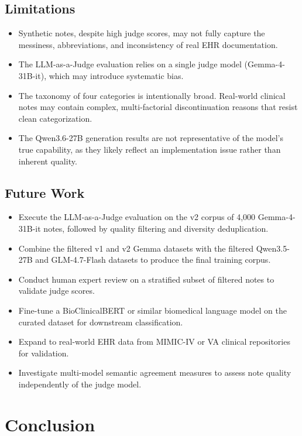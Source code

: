 \documentclass[11pt, a4paper]{article}
\begin{document}
\subsection{Limitations}

\begin{itemize}
    \item Synthetic notes, despite high judge scores, may not fully capture the messiness, abbreviations, and inconsistency of real EHR documentation.
    \item The LLM-as-a-Judge evaluation relies on a single judge model (Gemma-4-31B-it), which may introduce systematic bias.
    \item The taxonomy of four categories is intentionally broad. Real-world clinical notes may contain complex, multi-factorial discontinuation reasons that resist clean categorization.
    \item The Qwen3.6-27B generation results are not representative of the model's true capability, as they likely reflect an implementation issue rather than inherent quality.
\end{itemize}

\subsection{Future Work}

\begin{itemize}
    \item Execute the LLM-as-a-Judge evaluation on the v2 corpus of 4,000 Gemma-4-31B-it notes, followed by quality filtering and diversity deduplication.
    \item Combine the filtered v1 and v2 Gemma datasets with the filtered Qwen3.5-27B and GLM-4.7-Flash datasets to produce the final training corpus.
    \item Conduct human expert review on a stratified subset of filtered notes to validate judge scores.
    \item Fine-tune a BioClinicalBERT or similar biomedical language model on the curated dataset for downstream classification.
    \item Expand to real-world EHR data from MIMIC-IV or VA clinical repositories for validation.
    \item Investigate multi-model semantic agreement measures to assess note quality independently of the judge model.
\end{itemize}

\section{Conclusion}
\end{document}
